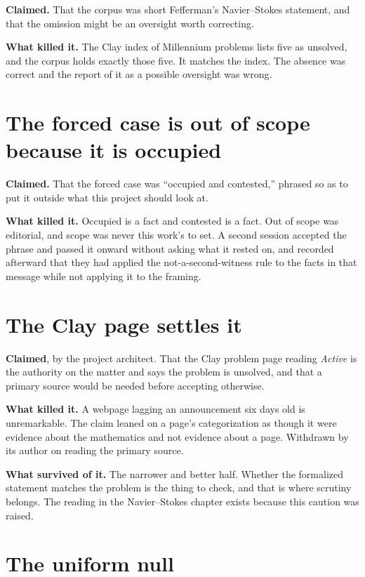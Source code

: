 \textbf{Claimed.} That the corpus was short Fefferman's Navier--Stokes statement, and that the
omission might be an oversight worth correcting.

\textbf{What killed it.} The Clay index of Millennium problems lists five as unsolved, and the
corpus holds exactly those five. It matches the index. The absence was correct and the report of it
as a possible oversight was wrong.

\section{The forced case is out of scope because it is occupied}

\textbf{Claimed.} That the forced case was ``occupied and contested,'' phrased so as to put it
outside what this project should look at.

\textbf{What killed it.} Occupied is a fact and contested is a fact. Out of scope was editorial, and
scope was never this work's to set. A second session accepted the phrase and passed it onward
without asking what it rested on, and recorded afterward that they had applied the
not-a-second-witness rule to the facts in that message while not applying it to the framing.

\section{The Clay page settles it}

\textbf{Claimed}, by the project architect. That the Clay problem page reading \emph{Active} is the
authority on the matter and says the problem is unsolved, and that a primary source would be needed
before accepting otherwise.

\textbf{What killed it.} A webpage lagging an announcement six days old is unremarkable. The claim
leaned on a page's categorization as though it were evidence about the mathematics and not
evidence about a page. Withdrawn by its author on reading the primary source.

\textbf{What survived of it.} The narrower and better half. Whether the formalized statement matches
the problem is the thing to check, and that is where scrutiny belongs. The reading in the
Navier--Stokes chapter exists because this caution was raised.

\section{The uniform null}


